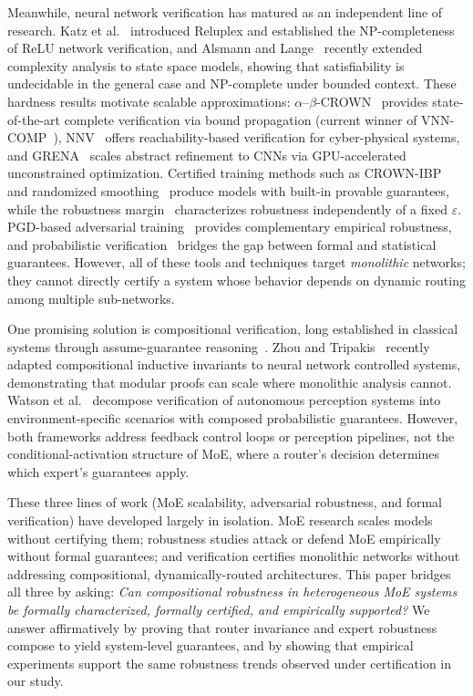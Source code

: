 \documentclass[runningheads]{llncs}
\begin{document}
Meanwhile, neural network verification has matured as an independent line of research. Katz et al.~\cite{katz2017} introduced Reluplex and established the NP-completeness of ReLU network verification, and Alsmann and Lange~\cite{alsmann2025complexity} recently extended complexity analysis to state space models, showing that satisfiability is undecidable in the general case and NP-complete under bounded context. These hardness results motivate scalable approximations: $\alpha$--$\beta$-CROWN~\cite{xu2020abcrown,wang2021} provides state-of-the-art complete verification via bound propagation (current winner of VNN-COMP~\cite{kaulen2025}), NNV~\cite{tran2020nnv} offers reachability-based verification for cyber-physical systems, and GRENA~\cite{zhong2025grena} scales abstract refinement to CNNs via GPU-accelerated unconstrained optimization. Certified training methods such as CROWN-IBP~\cite{zhang2020} and randomized smoothing~\cite{cohen2019} produce models with built-in provable guarantees, while the robustness margin~\cite{kielhoefer2025robustness} characterizes robustness independently of a fixed $\varepsilon$. PGD-based adversarial training~\cite{madry2018} provides complementary empirical robustness, and probabilistic verification~\cite{chwialkowski2025probabilistic} bridges the gap between formal and statistical guarantees. However, all of these tools and techniques target \emph{monolithic} networks; they cannot directly certify a system whose behavior depends on dynamic routing among multiple sub-networks.

One promising solution is compositional verification, long established in classical systems through assume-guarantee reasoning~\cite{henzinger1998}. Zhou and Tripakis~\cite{zhou2024compositional} recently adapted compositional inductive invariants to neural network controlled systems, demonstrating that modular proofs can scale where monolithic analysis cannot. Watson et al.~\cite{watson2025scenario} decompose verification of autonomous perception systems into environment-specific scenarios with composed probabilistic guarantees. However, both frameworks address feedback control loops or perception pipelines, not the conditional-activation structure of MoE, where a router's decision determines which expert's guarantees apply.

These three lines of work (MoE scalability, adversarial robustness, and formal verification) have developed largely in isolation. MoE research scales models without certifying them; robustness studies attack or defend MoE empirically without formal guarantees; and verification certifies monolithic networks without addressing compositional, dynamically-routed architectures. This paper bridges all three by asking: \textit{Can compositional robustness in heterogeneous MoE systems be formally characterized, formally certified, and empirically supported?} We answer affirmatively by proving that router invariance and expert robustness compose to yield system-level guarantees, and by showing that empirical experiments support the same robustness trends observed under certification in our study.
\end{document}
